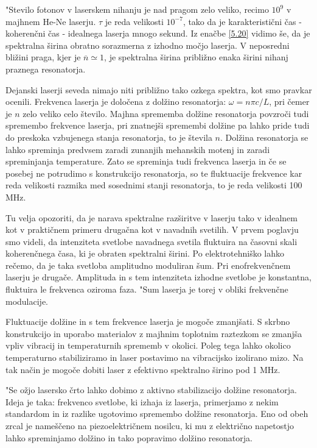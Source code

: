 "Stevilo fotonov v laserskem nihanju je nad pragom zelo veliko, recimo $10^9$
v majhnem He-Ne laserju. $\tau$ je reda velikosti $10^{-7}$, tako da je
karakteristični čas - koherenčni čas - idealnega laserja mnogo sekund.
Iz enačbe \ref{5.20} vidimo še, da je spektralna širina obratno
sorazmerna z izhodno močjo laserja. V neposredni bližini praga, kjer je $%
\overline{n}\simeq 1$, je spektralna širina približno enaka širini nihanj
praznega resonatorja.

Dejanski laserji seveda nimajo niti približno tako ozkega spektra, kot smo
pravkar ocenili. Frekvenca laserja je določena z dolžino resonatorja: $%
\omega=n\pi c/L$, pri čemer je $n$ zelo veliko celo število. Majhna
sprememba dolžine resonatorja povzroči tudi spremembo frekvence laserja,
pri znatnejši spremembi dolžine pa lahko pride tudi do preskoka vzbujenega
stanja resonatorja, to je števila $n$. Dolžina resonatorja se lahko
spreminja predvsem zaradi zunanjih mehanskih motenj in zaradi spreminjanja
temperature. Zato se spreminja tudi frekvenca laserja in če se posebej ne
potrudimo s konstrukcijo resonatorja, so te fluktuacije frekvence kar reda
velikosti razmika med sosednimi stanji resonatorja, to je reda velikosti 100
MHz.

Tu velja opozoriti, da je narava spektralne razširitve v laserju tako v
idealnem kot v praktičnem primeru drugačna kot v navadnih svetilih. V
prvem poglavju smo videli, da intenziteta svetlobe navadnega svetila
fluktuira na časovni skali koherenčnega časa, ki je obraten spektralni
širini. Po elektrotehniško lahko rečemo, da je taka svetloba amplitudno
moduliran šum. Pri enofrekvenčnem laserju je drugače. Amplituda in s tem
intenziteta izhodne svetlobe je konstantna, fluktuira le frekvenca oziroma
faza. "Sum laserja je torej v obliki frekvenčne modulacije.

Fluktuacije dolžine in s tem frekvence laserja je mogoče zmanjšati. S
skrbno konstrukcijo in uporabo materialov z majhnim toplotnim raztezkom se
zmanjša vpliv vibracij in temperaturnih sprememb v okolici. Poleg tega
lahko okolico temperaturno stabiliziramo in laser postavimo na vibracijsko
izolirano mizo. Na tak način je mogoče dobiti laser z efektivno spektralno
širino pod 1 MHz.

"Se ožjo lasersko črto lahko dobimo z aktivno stabilizacijo dolžine
resonatorja. Ideja je taka: frekvenco svetlobe, ki izhaja iz laserja,
primerjamo z nekim standardom in iz razlike ugotovimo spremembo dolžine
resonatorja. Eno od obeh zrcal je nameščeno na piezoelektričnem nosilcu,
ki mu z električno napetostjo lahko spreminjamo dolžino in tako popravimo
dolžino resonatorja.

